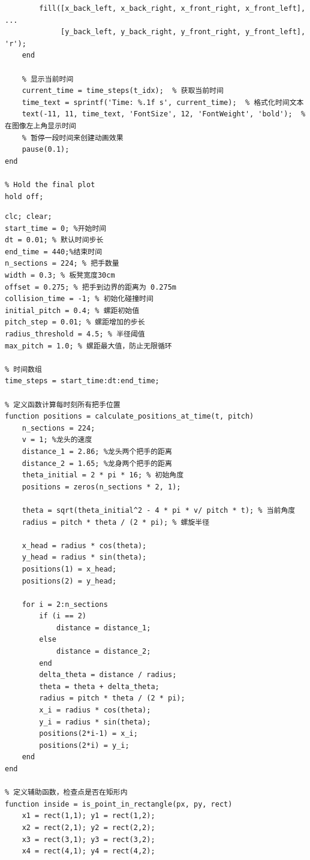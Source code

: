 \documentclass{cumcmthesis1}
\begin{document}
\begin{lstlisting}[caption={问题2中对板凳龙运动及碰撞进行模拟的代码}, label={lst:third_code}]
        % 绘制矩形 (表示板凳)
        fill([x_back_left, x_back_right, x_front_right, x_front_left], ...
             [y_back_left, y_back_right, y_front_right, y_front_left], 'r');
    end
    
    % 显示当前时间
    current_time = time_steps(t_idx);  % 获取当前时间
    time_text = sprintf('Time: %.1f s', current_time);  % 格式化时间文本
    text(-11, 11, time_text, 'FontSize', 12, 'FontWeight', 'bold');  % 在图像左上角显示时间
    % 暂停一段时间来创建动画效果
    pause(0.1);
end

% Hold the final plot
hold off;

\end{lstlisting}


\begin{lstlisting}[caption={求解问题3的代码，将求解过程和结果打印到控制台}, label={lst:fourth_code}]
clc; clear;
start_time = 0; %开始时间
dt = 0.01; % 默认时间步长
end_time = 440;%结束时间
n_sections = 224; % 把手数量
width = 0.3; % 板凳宽度30cm
offset = 0.275; % 把手到边界的距离为 0.275m
collision_time = -1; % 初始化碰撞时间
initial_pitch = 0.4; % 螺距初始值
pitch_step = 0.01; % 螺距增加的步长
radius_threshold = 4.5; % 半径阈值
max_pitch = 1.0; % 螺距最大值，防止无限循环

% 时间数组
time_steps = start_time:dt:end_time;

% 定义函数计算每时刻所有把手位置
function positions = calculate_positions_at_time(t, pitch)
    n_sections = 224;
    v = 1; %龙头的速度
    distance_1 = 2.86; %龙头两个把手的距离
    distance_2 = 1.65; %龙身两个把手的距离
    theta_initial = 2 * pi * 16; % 初始角度
    positions = zeros(n_sections * 2, 1);
    
    theta = sqrt(theta_initial^2 - 4 * pi * v/ pitch * t); % 当前角度
    radius = pitch * theta / (2 * pi); % 螺旋半径
    
    x_head = radius * cos(theta); 
    y_head = radius * sin(theta);
    positions(1) = x_head;
    positions(2) = y_head;
    
    for i = 2:n_sections
        if (i == 2)
            distance = distance_1;
        else
            distance = distance_2;
        end
        delta_theta = distance / radius;
        theta = theta + delta_theta;
        radius = pitch * theta / (2 * pi);
        x_i = radius * cos(theta);
        y_i = radius * sin(theta);
        positions(2*i-1) = x_i;
        positions(2*i) = y_i;
    end
end

% 定义辅助函数，检查点是否在矩形内
function inside = is_point_in_rectangle(px, py, rect)
    x1 = rect(1,1); y1 = rect(1,2);
    x2 = rect(2,1); y2 = rect(2,2);
    x3 = rect(3,1); y3 = rect(3,2);
    x4 = rect(4,1); y4 = rect(4,2);
    

\end{lstlisting}
\end{document}
